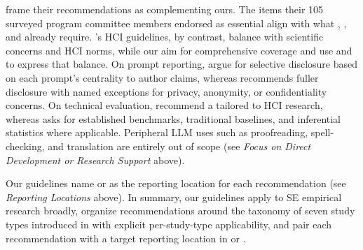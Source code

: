\citeauthor{DBLP:journals/corr/abs-2601-01954} frame their recommendations as complementing ours. The items their 105 surveyed program committee members endorsed as essential align with what \modelversion, \design, and \limitationsmitigations already require. \citeauthor{DBLP:conf/chi/NavarroSA26}'s HCI guidelines, by contrast, balance  with scientific concerns and HCI norms, while our \guidelines aim for comprehensive coverage and use \must and \should to express that balance. On prompt reporting, \citeauthor{DBLP:conf/chi/NavarroSA26} argue for selective disclosure based on each prompt's centrality to author claims, whereas \design recommends fuller disclosure with named exceptions for privacy, anonymity, or confidentiality concerns. On technical evaluation, \citeauthor{DBLP:conf/chi/NavarroSA26} recommend a  tailored to HCI research, whereas \benchmarksmetrics asks for established benchmarks, traditional baselines, and inferential statistics where applicable. Peripheral LLM uses such as proofreading, spell-checking, and translation are entirely out of scope (see \emph{Focus on Direct Development or Research Support} above).

Our guidelines name \paper or \supplementarymaterial as the reporting location for each recommendation (see \emph{Reporting Locations} above). In summary, our guidelines apply to SE empirical research broadly, organize recommendations around the taxonomy of seven study types introduced in \studytypes with explicit per-study-type applicability, and pair each recommendation with a target reporting location in \paper or \supplementarymaterial.